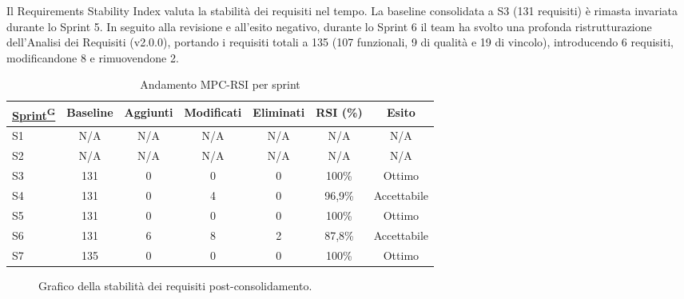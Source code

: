 \documentclass[a4paper,12pt]{article}
\providecommand{\glslink}[2]{\href{https://alittlebyte-19.github.io/Documentazione/glossario.html\#gls-#1}{\underline{#2}\textsuperscript{\scriptsize G}}}
\begin{document}
Il Requirements Stability Index valuta la stabilità dei requisiti nel tempo. La baseline consolidata a S3 (131 requisiti) è rimasta invariata durante lo Sprint 5. In seguito alla revisione e all'esito negativo, durante lo Sprint 6 il team ha svolto una profonda ristrutturazione dell'Analisi dei Requisiti (v2.0.0), portando i requisiti totali a 135 (107 funzionali, 9 di qualità e 19 di vincolo), introducendo 6 requisiti, modificandone 8 e rimuovendone 2.

\begin{table}[H]
    \centering
    \begin{tabular}{|l|c|c|c|c|c|c|}
        \hline
        \rowcolor{gray!35}
        \textbf{\glslink{sprint}{Sprint}} & \textbf{Baseline} & \textbf{Aggiunti} & \textbf{Modificati} & \textbf{Eliminati} & \textbf{RSI (\%)} & \textbf{Esito} \\
        \hline
        S1 & N/A & N/A & N/A & N/A & N/A & N/A \\
        S2 & N/A & N/A & N/A & N/A & N/A & N/A \\
        S3 & 131 & 0 & 0 & 0 & 100\% & \textcolor{green!60!black}{Ottimo} \\
        S4 & 131 & 0 & 4 & 0 & 96{,}9\% & \textcolor{green!60!black}{Accettabile} \\
        S5 & 131 & 0 & 0 & 0 & 100\% & \textcolor{green!60!black}{Ottimo} \\
        S6 & 131 & 6 & 8 & 2 & 87{,}8\% & \textcolor{green!60!black}{Accettabile} \\
        S7 & 135 & 0 & 0 & 0 & 100\% & \textcolor{green!60!black}{Ottimo} \\
        \hline
    \end{tabular}
    \caption{Andamento MPC-RSI per sprint}
\end{table}

\begin{figure}[H]
\centering
{}
\caption{Grafico della stabilità dei requisiti post-consolidamento.}
\end{figure}
\end{document}
